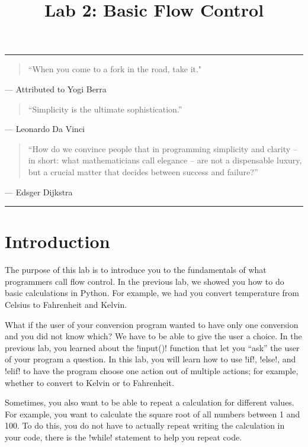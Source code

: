 \documentclass[11pt]{cselabheader}
\title{Lab 2: Basic Flow Control}
\begin{document}
\maketitle

\hrule

\begin{quotation}
``When you come to a fork in the road, take it."
\end{quotation}
\begin{flushright}
--- Attributed to Yogi Berra
\end{flushright}

\begin{quotation}
``Simplicity is the ultimate sophistication.''
\end{quotation}
\begin{flushright}
--- Leonardo Da Vinci
\end{flushright}

\begin{quotation}
``How do we convince people that in programming simplicity and clarity -- in
short: what mathematicians call elegance -- are not a dispensable luxury, but
a crucial matter that decides between success and failure?''
\end{quotation}
\begin{flushright}
--- Edsger Dijkstra
\end{flushright}

\hrule

\section{Introduction}
The purpose of this lab is to introduce you to the fundamentals of what
programmers call flow control. In the previous lab, we showed you how to do
basic calculations in Python. For example, we had you convert temperature from
Celsius to Fahrenheit and Kelvin.

What if the user of your conversion program wanted to have only one conversion
and you did not know which? We have to be able to give the user a choice. In the
previous lab, you learned about the \pythoninline!input()! function that let you
``ask'' the user of your program a question. In this lab, you will learn how to
use \pythoninline!if!, \pythoninline!else!, and \pythoninline!elif! to have the program
choose one action out of multiple actions; for example, whether to convert to
Kelvin or to Fahrenheit.

Sometimes, you also want to be able to repeat a calculation for different
values. For example, you want to calculate the square root of all numbers
between 1 and 100. To do this, you do not have to actually repeat writing the
calculation in your code, there is the \pythoninline!while! statement to help you
repeat code.
\end{document}
